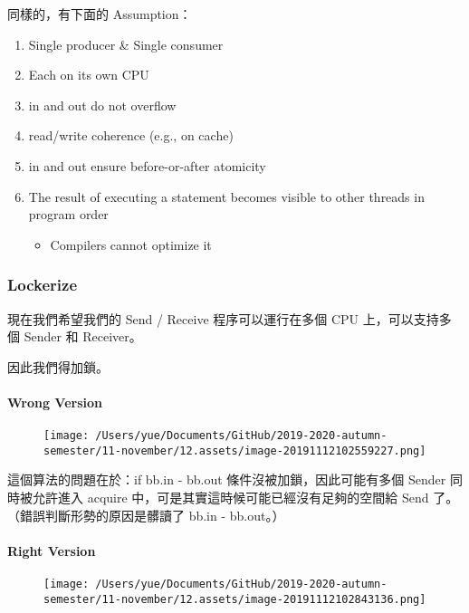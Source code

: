\documentclass[
]{article}
\begin{document}
同樣的，有下面的 Assumption：

\begin{enumerate}
\def\labelenumi{\arabic{enumi}.}
\item
  Single producer \& Single consumer 
\item
  Each on its own CPU
\item
  in and out do not overflow 
\item
  read/write coherence (e.g., on cache)
\item
  in and out ensure before-or-after atomicity
\item
  The result of executing a statement becomes visible to other threads
  in program order

  \begin{itemize}
  \item
    Compilers cannot optimize it
  \end{itemize}
\end{enumerate}

\hypertarget{header-n173}{%
\subsubsection{Lockerize}\label{header-n173}}

現在我們希望我們的 Send / Receive 程序可以運行在多個 CPU
上，可以支持多個 Sender 和 Receiver。

因此我們得加鎖。

\hypertarget{header-n176}{%
\paragraph{Wrong Version}\label{header-n176}}

\begin{figure}
\centering
\texttt{[image: /Users/yue/Documents/GitHub/2019-2020-autumn-semester/11-november/12.assets/image-20191112102559227.png]}
\caption{}
\end{figure}

這個算法的問題在於：if bb.in - bb.out 條件沒被加鎖，因此可能有多個
Sender 同時被允許進入 acquire 中，可是其實這時候可能已經沒有足夠的空間給
Send 了。（錯誤判斷形勢的原因是髒讀了 bb.in - bb.out。）

\hypertarget{header-n179}{%
\paragraph{Right Version}\label{header-n179}}

\begin{figure}
\centering
\texttt{[image: /Users/yue/Documents/GitHub/2019-2020-autumn-semester/11-november/12.assets/image-20191112102843136.png]}
\caption{}
\end{figure}
\end{document}
